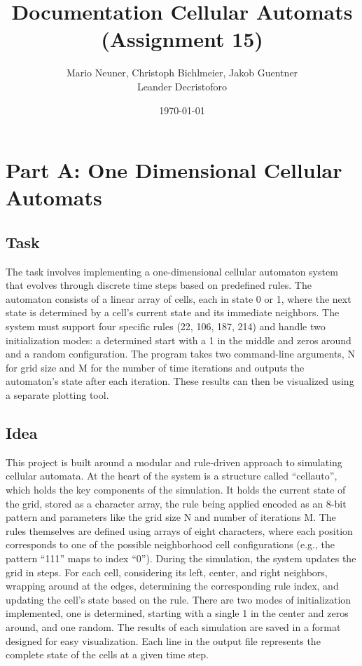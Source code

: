 \documentclass[12pt,a4paper]{article}
\title{\textbf{Documentation Cellular Automats (Assignment 15)}}
\author{Mario Neuner, Christoph Bichlmeier, Jakob Guentner\\Leander Decristoforo}
\date{\today}
\begin{document}
\maketitle

\newpage
\tableofcontents
\pagebreak


\section{Part A: One Dimensional Cellular Automats}
\vspace{1cm}


\subsection{Task}
The task involves implementing a one-dimensional cellular automaton system that 
evolves through discrete time steps based on predefined rules. The automaton consists 
of a linear array of cells, each in state 0 or 1, where the next state is determined by 
a cell's current state and its immediate neighbors. The system must support four specific 
rules (22, 106, 187, 214) and handle two initialization modes: a determined start with a 1 
in the middle and zeros around and a random configuration. The program takes two command-line 
arguments, N for grid size and M for the number of time iterations and outputs the automaton's 
state after each iteration. These results can then be visualized using a separate plotting tool.
\newline

\vspace{1cm}


\subsection{Idea}
This project is built around a modular and rule-driven approach to simulating cellular automata. 
At the heart of the system is a structure called “cellauto”, which holds the key components of the 
simulation. It holds the current state of the grid, stored as a character array, the rule being applied 
encoded as an 8-bit pattern and parameters like the grid size N and number of iterations M.
\newline
The rules themselves are defined using arrays of eight characters, where each position corresponds to 
one of the possible neighborhood cell configurations (e.g., the pattern “111” maps to index “0”). During 
the simulation, the system updates the grid in steps. For each cell, considering its left, center, and right 
neighbors, wrapping around at the edges, determining the corresponding rule index, and updating the cell’s 
state based on the rule.
\newline
There are two modes of initialization implemented, one is determined, starting with a 
single 1 in the center and zeros around, and one random. 
The results of each simulation are saved in a format designed for easy visualization. 
Each line in the output file represents the complete state of the cells at a given time step.
\newline
\end{document}
